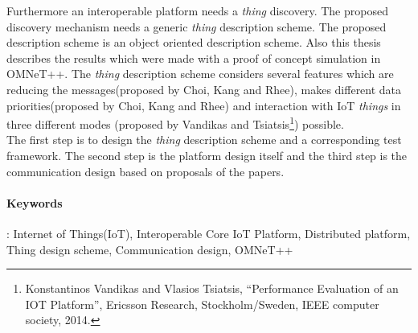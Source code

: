 \documentclass[11pt]{article}
\begin{document}
Furthermore an interoperable platform needs a \textit{thing} discovery. The
proposed discovery mechanism needs a generic \textit{thing} description scheme. The proposed description scheme is an object oriented
description scheme.
Also this thesis describes the results which were made with a proof of concept simulation in OMNeT++. The \textit{thing} description scheme
considers several features which are reducing the messages(proposed by Choi, Kang and Rhee\footnotemark[1]), makes different data priorities(proposed
by Choi, Kang and Rhee\footnotemark[1]) and interaction with IoT \textit{things} in three different modes (proposed by Vandikas and
Tsiatsis\footnote[2]{Konstantinos Vandikas and Vlasios Tsiatsis, “Performance Evaluation of an IOT Platform”, Ericsson Research,
Stockholm/Sweden, IEEE computer society, 2014.}) possible. \\

The first step is to design the \textit{thing} description scheme and a corresponding test framework. The second step is the
platform design itself and the third step is the communication design based on proposals of the papers\footnotemark[1] \footnotemark[2]. \\


\paragraph{Keywords}: Internet of Things(IoT), Interoperable Core IoT Platform, Distributed platform, Thing design scheme, Communication
design, OMNeT++
\end{document}
